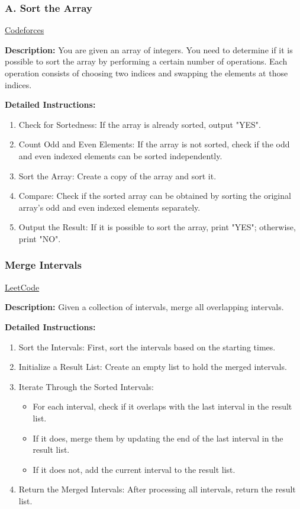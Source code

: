 \subsubsection{A. Sort the Array}
\href{https://codeforces.com/problemset/problem/1360/A}{Codeforces}

\textbf{Description:} You are given an array of integers. You need to determine if it is possible to sort the array by performing a certain number of operations. Each operation consists of choosing two indices and swapping the elements at those indices.

\textbf{Detailed Instructions:}
\begin{enumerate}
    \item Check for Sortedness: If the array is already sorted, output "YES".
    \item Count Odd and Even Elements: If the array is not sorted, check if the odd and even indexed elements can be sorted independently.
    \item Sort the Array: Create a copy of the array and sort it.
    \item Compare: Check if the sorted array can be obtained by sorting the original array's odd and even indexed elements separately.
    \item Output the Result: If it is possible to sort the array, print "YES"; otherwise, print "NO".
\end{enumerate}

\subsubsection{Merge Intervals}
\href{https://leetcode.com/problems/merge-intervals/}{LeetCode}

\textbf{Description:} Given a collection of intervals, merge all overlapping intervals.

\textbf{Detailed Instructions:}
\begin{enumerate}
    \item Sort the Intervals: First, sort the intervals based on the starting times.
    \item Initialize a Result List: Create an empty list to hold the merged intervals.
    \item Iterate Through the Sorted Intervals:
    \begin{itemize}
        \item For each interval, check if it overlaps with the last interval in the result list.
        \item If it does, merge them by updating the end of the last interval in the result list.
        \item If it does not, add the current interval to the result list.
    \end{itemize}
    \item Return the Merged Intervals: After processing all intervals, return the result list.
\end{enumerate}